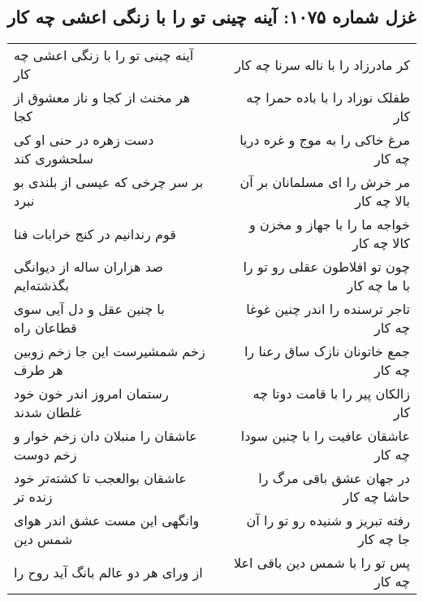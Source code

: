 \begin{center}
\section*{غزل شماره ۱۰۷۵: آینه چینی تو را با زنگی اعشی چه کار}
\label{sec:1075}
\begin{longtable}{l p{0.5cm} r}
آینه چینی تو را با زنگی اعشی چه کار
&&
کر مادرزاد را با ناله سرنا چه کار
\\
هر مخنث از کجا و ناز معشوق از کجا
&&
طفلک نوزاد را با باده حمرا چه کار
\\
دست زهره در حنی او کی سلحشوری کند
&&
مرغ خاکی را به موج و غره دریا چه کار
\\
بر سر چرخی که عیسی از بلندی بو نبرد
&&
مر خرش را ای مسلمانان بر آن بالا چه کار
\\
قوم رندانیم در کنج خرابات فنا
&&
خواجه ما را با جهاز و مخزن و کالا چه کار
\\
صد هزاران ساله از دیوانگی بگذشته‌ایم
&&
چون تو افلاطون عقلی رو تو را با ما چه کار
\\
با چنین عقل و دل آیی سوی قطاعان راه
&&
تاجر ترسنده را اندر چنین غوغا چه کار
\\
زخم شمشیرست این جا زخم زوبین هر طرف
&&
جمع خاتونان نازک ساق رعنا را چه کار
\\
رستمان امروز اندر خون خود غلطان شدند
&&
زالکان پیر را با قامت دوتا چه کار
\\
عاشقان را منبلان دان زخم خوار و زخم دوست
&&
عاشقان عافیت را با چنین سودا چه کار
\\
عاشقان بوالعجب تا کشته‌تر خود زنده تر
&&
در جهان عشق باقی مرگ را حاشا چه کار
\\
وانگهی این مست عشق اندر هوای شمس دین
&&
رفته تبریز و شنیده رو تو را آن جا چه کار
\\
از ورای هر دو عالم بانگ آید روح را
&&
پس تو را با شمس دین باقی اعلا چه کار
\\
\end{longtable}
\end{center}
